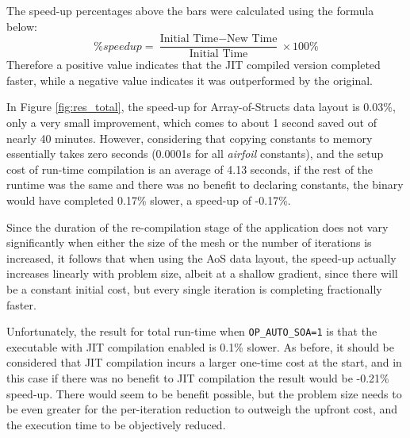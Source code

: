 \noindent The speed-up percentages above the bars were calculated using the formula below:
\[ \%speedup = \frac{\text{Initial Time}-\text{New Time}}{\text{Initial Time}} \times 100\%\]
Therefore a positive value indicates that the JIT compiled version completed faster, while a negative value indicates it was outperformed by the original.


\noindent In Figure \ref{fig:res_total}, the speed-up for Array-of-Structs data layout is 0.03\%, only a very small improvement, which comes to about 1 second saved out of nearly 40 minutes. However, considering that copying constants to memory essentially takes zero seconds (0.0001s for all \textit{airfoil} constants), and the setup cost of run-time compilation is an average of 4.13 seconds, if the rest of the runtime was the same and there was no benefit to declaring constants, the binary would have completed 0.17\% slower, a speed-up of -0.17\%.
\par
Since the duration of the re-compilation stage of the application does not vary significantly when either the size of the mesh or the number of iterations is increased, it follows that when using the AoS data layout, the speed-up actually increases linearly with problem size, albeit at a shallow gradient, since there will be a constant initial cost, but every single iteration is completing fractionally faster.
\par
Unfortunately, the result for total run-time when \verb|OP_AUTO_SOA=1| is that the executable with JIT compilation enabled is 0.1\% slower. As before, it should be considered that JIT compilation incurs a larger one-time cost at the start, and in this case if there was no benefit to JIT compilation the result would be -0.21\% speed-up. There would seem to be benefit possible, but the problem size needs to be even greater for the per-iteration reduction to outweigh the upfront cost, and the execution time to be objectively reduced.\par
